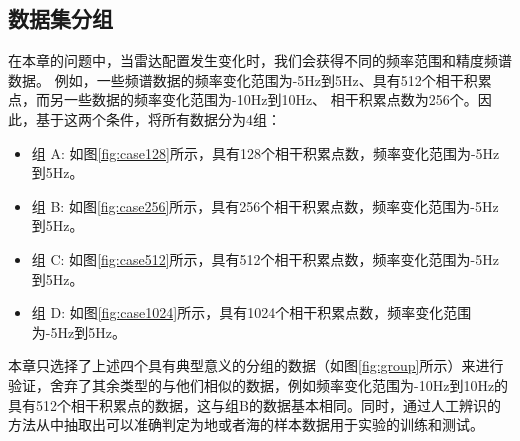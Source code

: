 \subsection{数据集分组}
在本章的问题中，当雷达配置发生变化时，我们会获得不同的频率范围和精度频谱数据。
例如，一些频谱数据的频率变化范围为-5Hz到5Hz、具有512个相干积累点，而另一些数据的频率变化范围为-10Hz到10Hz、
相干积累点数为256个。因此，基于这两个条件，将所有数据分为4组：
\begin{itemize}
	\item 组 A: 如图\ref{fig:case128}所示，具有128个相干积累点数，频率变化范围为-5Hz到5Hz。
	\item 组 B: 如图\ref{fig:case256}所示，具有256个相干积累点数，频率变化范围为-5Hz到5Hz。
	\item 组 C: 如图\ref{fig:case512}所示，具有512个相干积累点数，频率变化范围为-5Hz到5Hz。
	\item 组 D: 如图\ref{fig:case1024}所示，具有1024个相干积累点数，频率变化范围为-5Hz到5Hz。
\end{itemize}
本章只选择了上述四个具有典型意义的分组的数据（如图\ref{fig:group}所示）来进行验证，舍弃了其余类型的与他们相似的数据，例如频率变化范围为-10Hz到10Hz的具有512个相干积累点的数据，这与组B的数据基本相同。同时，通过人工辨识的方法从中抽取出可以准确判定为地或者海的样本数据用于实验的训练和测试。
